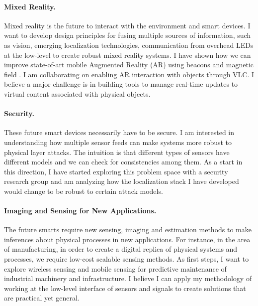 \documentclass[10pt]{article}
\begin{document}
\paragraph{Mixed Reality. }
Mixed reality is the future to interact with the environment and smart devices. I want to develop design principles for fusing multiple sources of information, such as vision, emerging localization technologies, communication from overhead LEDs at the low-level to create robust mixed reality systems. 
I have shown how we can improve state-of-art mobile Augmented Reality (AR) using beacons and magnetic field \cite{mobileAR}. I am collaborating on enabling AR interaction with objects through VLC. I believe a major challenge is in building tools to manage real-time updates to virtual content associated with physical objects. 

\paragraph{Security. }
These future smart devices necessarily have to be secure. I am interested in understanding how multiple sensor feeds can make systems more robust to physical layer attacks. The intuition is that different types of sensors have different models and we can check for consistencies among them. %
As a start in this direction, I have started exploring this problem space with a security research group and am analyzing how the localization stack I have developed would change to be robust to certain attack models. 

\paragraph{Imaging and Sensing for New Applications. }
The future smarts require  new sensing, imaging and estimation methods to make inferences about physical processes in new applications. For instance, in the area of manufacturing, in order to create a digital replica of physical systems and processes, we require low-cost scalable sensing methods.  As first steps, I want to explore wireless sensing and mobile sensing for predictive maintenance of industrial machinery and infrastructure. I believe I can apply my methodology of working at the low-level interface of sensors and signals to create solutions that are practical yet general.
\end{document}
